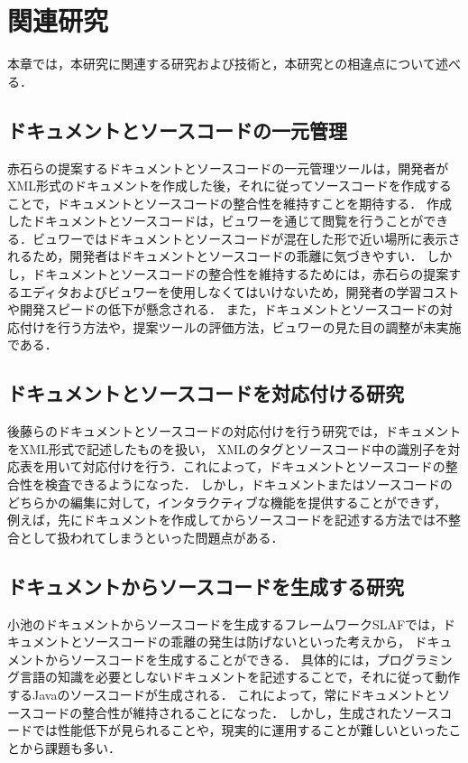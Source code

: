 \chapter{関連研究}
本章では，本研究に関連する研究および技術と，本研究との相違点について述べる．

\section{ドキュメントとソースコードの一元管理}
赤石らの提案するドキュメントとソースコードの一元管理ツール\cite{seigousei}は，開発者がXML形式のドキュメントを作成した後，それに従ってソースコードを作成することで，ドキュメントとソースコードの整合性を維持すことを期待する．
作成したドキュメントとソースコードは，ビュワーを通じて閲覧を行うことができる．ビュワーではドキュメントとソースコードが混在した形で近い場所に表示されるため，開発者はドキュメントとソースコードの乖離に気づきやすい．
しかし，ドキュメントとソースコードの整合性を維持するためには，赤石らの提案するエディタおよびビュワーを使用しなくてはいけないため，開発者の学習コストや開発スピードの低下が懸念される．
また，ドキュメントとソースコードの対応付けを行う方法や，提案ツールの評価方法，ビュワーの見た目の調整が未実施である．

\section{ドキュメントとソースコードを対応付ける研究}
後藤らのドキュメントとソースコードの対応付けを行う研究\cite{taiouduke}では，ドキュメントをXML形式で記述したものを扱い，
XMLのタグとソースコード中の識別子を対応表を用いて対応付けを行う．これによって，ドキュメントとソースコードの整合性を検査できるようになった．
しかし，ドキュメントまたはソースコードのどちらかの編集に対して，インタラクティブな機能を提供することができず，
例えば，先にドキュメントを作成してからソースコードを記述する方法では不整合として扱われてしまうといった問題点がある．

\section{ドキュメントからソースコードを生成する研究}
小池のドキュメントからソースコードを生成するフレームワークSLAF\cite{framework}では，ドキュメントとソースコードの乖離の発生は防げないといった考えから，
ドキュメントからソースコードを生成することができる．
具体的には，プログラミング言語の知識を必要としないドキュメントを記述することで，それに従って動作するJavaのソースコードが生成される．
これによって，常にドキュメントとソースコードの整合性が維持されることになった．
しかし，生成されたソースコードでは性能低下が見られることや，現実的に運用することが難しいといったことから課題も多い．

